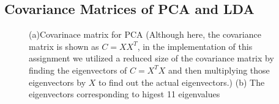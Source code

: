 \documentclass{article}
\begin{document}
\subsection{Covariance Matrices of PCA and LDA}
\begin{figure}[!htbp]
     \centering
     \captionsetup[subfigure]{labelformat=empty}
    \caption{(a)Covarinace matrix for PCA (Although here, the covariance matrix is shown as $C=XX^T$, in the implementation of this assignment we utilized a reduced size of the covariance matrix by finding the eigenvectors of $C=X^TX$ and then multiplying those eigenvectors by $X$ to find out the actual eigenvectors.) (b) The eigenvectors corresponding to higest 11 eigenvalues}
    \label{fig:CM_PCA}
\end{figure}
\end{document}
